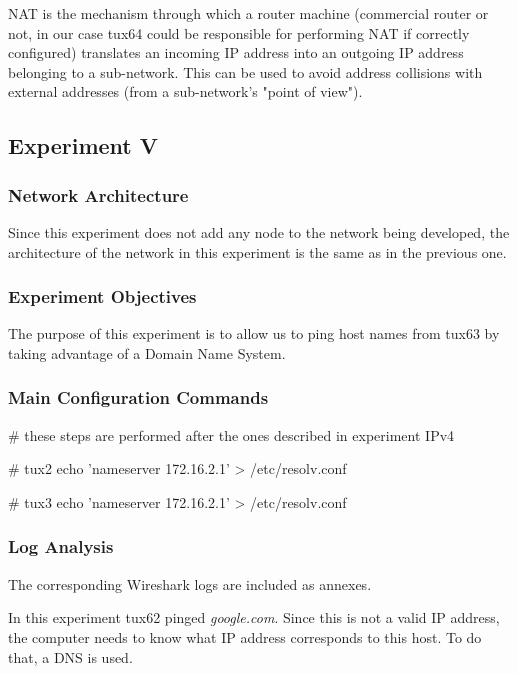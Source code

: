 NAT is the mechanism through which a router machine (commercial router or not, in our case tux64 could be responsible for performing NAT if correctly configured) translates an incoming IP address into an outgoing IP address belonging to a sub-network. This can be used to avoid address collisions with external addresses (from a sub-network's "point of view").

\subsection{Experiment V}

\subsubsection{Network Architecture}

Since this experiment does not add any node to the network being developed, the architecture of the network in this experiment is the same as in the previous one.

\subsubsection{Experiment Objectives}

The purpose of this experiment is to allow us to ping host names from tux63 by taking advantage of a Domain Name System.

\subsubsection{Main Configuration Commands}

\begin{code-bash}
# these steps are performed after the ones described in experiment IPv4

# tux2
echo 'nameserver 172.16.2.1' > /etc/resolv.conf

# tux3
echo 'nameserver 172.16.2.1' > /etc/resolv.conf

\end{code-bash}

\subsubsection{Log Analysis}

The corresponding Wireshark logs are included as annexes.

In this experiment tux62 pinged \textit{google.com}. Since this is not a valid IP address, the computer needs to know what IP address corresponds to this host. To do that, a DNS is used.

